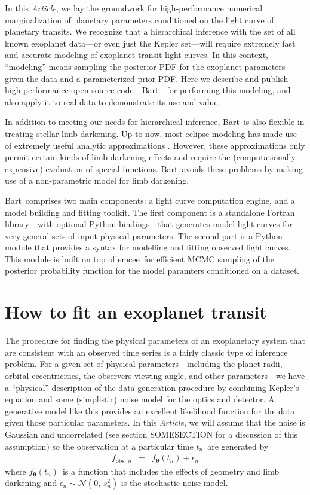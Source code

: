 \documentclass[12pt,preprint]{aastex}
\newcommand{\project}[1]{{\sffamily #1}}
\newcommand{\bart}{\project{Bart}}
\newcommand{\emcee}{\project{emcee}}
\newcommand{\paper}{\emph{Article}}
\newcommand{\bvec}[1]{\ensuremath{\boldsymbol{#1}}}
\newcommand{\normal}[1]{\ensuremath{\mathcal{N}(#1)}}
\newcommand{\model}{\ensuremath{\bvec{\theta}}}
\newcommand{\tobs}{\ensuremath{t_n}}
\newcommand{\fmodel}{\ensuremath{f_{\model} (\tobs)}}
\newcommand{\fobs}{\ensuremath{f_{\mathrm{obs};\,n}}}
\newcommand{\fullerr}{\ensuremath{s_n^2}}
\begin{document}
In this \paper, we lay the groundwork for high-performance numerical
marginalization of planetary parameters conditioned on the light curve of
planetary transits.
We recognize that a hierarchical inference
with the set of all known exoplanet data---or even just the
\project{Kepler} set---will require extremely fast and accurate modeling of
exoplanet transit light curves.
In this context, ``modeling'' means sampling the posterior PDF for the
exoplanet parameters given the data and a parameterized prior PDF.
Here we describe and publish high performance open-source code---\bart---for
performing this modeling, and also apply it to real data to demonstrate its
use and value.

In addition to meeting our needs for hierarchical inference, \bart\ is
also flexible in treating stellar limb darkening.
Up to now, most eclipse modeling has made use of extremely useful analytic
approximations \citep{mandel}.
However, these approximations only permit certain kinds of limb-darkening
effects and require the (computationally expensive) evaluation of special
functions.
\bart\ avoids these problems by making use of a non-parametric model for limb
darkening.

\bart\ comprises two main components: a light curve computation engine, and a
model building and fitting  toolkit.
The first component is a standalone Fortran library---with optional Python
bindings---that generates model light curves for very general sets of input
physical parameters.
The second part is a Python module that provides a syntax for modelling and
fitting observed light curves.
This module is built on top of \emcee\ for efficient MCMC sampling of the
posterior probability function for the model paramters conditioned on a
dataset.


\section{How to fit an exoplanet transit}

The procedure for finding the physical parameters of an exoplanetary system
that are consistent with an observed time series is a fairly classic type of
inference problem.
For a given set of physical parameters---including the
planet radii, orbital eccentricities, the observers viewing angle, and other
parameters---we have a ``physical'' description of the data generation
procedure by combining Kepler's equation and some (simplistic) noise model for
the optics and detector.
A generative model like this provides an excellent
likelihood function for the data given those particular parameters.
In this \paper, we will assume that the noise is Gaussian and uncorrelated
(see section SOMESECTION for a discussion of this assumption) so the
observation at a particular time \tobs\ are generated by
\begin{eqnarray}
    \fobs & = & \fmodel + \epsilon_n
\end{eqnarray}
where \fmodel\ is a function that includes the effects of geometry
and limb darkening and $\epsilon_n \sim \normal{0,\,\fullerr}$ is the
stochastic noise model.
\end{document}
